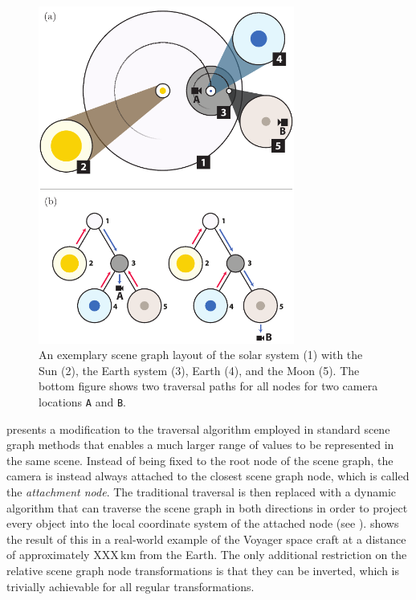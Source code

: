 \begin{figure}
\centering
\includegraphics[width=0.75\textwidth]{figures/contributions/dsg/scenegraph.pdf}
\caption{An exemplary scene graph layout of the solar system (1) with the Sun (2), the Earth system (3), Earth (4), and the Moon (5). The bottom figure shows two traversal paths for all nodes for two camera locations \texttt{A} and \texttt{B}.}
\label{contributions:astro:dsg:scenegraph}
\end{figure}

 presents a modification to the traversal algorithm employed in standard scene graph methods that enables a much larger range of values to be represented in the same scene.  Instead of being fixed to the root node of the scene graph, the camera is instead always attached to the closest scene graph node, which is called the \emph{attachment node}.  The traditional traversal is then replaced with a dynamic algorithm that can traverse the scene graph in both directions in order to project every object into the local coordinate system of the attached node (see ).   shows the result of this in a real-world example of the Voyager space craft at a distance of approximately XXX\,km from the Earth.  The only additional restriction on the relative scene graph node transformations is that they can be inverted, which is trivially achievable for all regular transformations.

